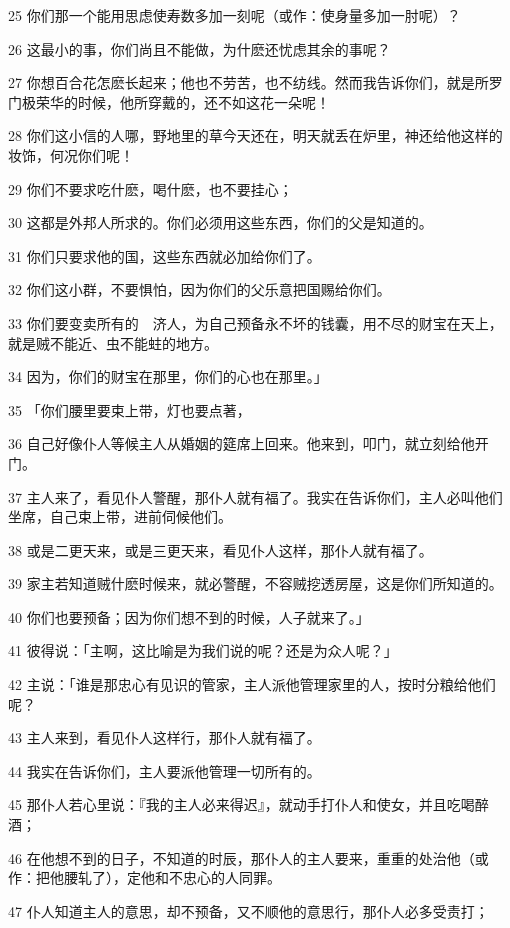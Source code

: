 \par 25 你们那一个能用思虑使寿数多加一刻呢（或作：使身量多加一肘呢）？
\par 26 这最小的事，你们尚且不能做，为什麽还忧虑其余的事呢？
\par 27 你想百合花怎麽长起来；他也不劳苦，也不纺线。然而我告诉你们，就是所罗门极荣华的时候，他所穿戴的，还不如这花一朵呢！
\par 28 你们这小信的人哪，野地里的草今天还在，明天就丢在炉里，神还给他这样的妆饰，何况你们呢！
\par 29 你们不要求吃什麽，喝什麽，也不要挂心；
\par 30 这都是外邦人所求的。你们必须用这些东西，你们的父是知道的。
\par 31 你们只要求他的国，这些东西就必加给你们了。
\par 32 你们这小群，不要惧怕，因为你们的父乐意把国赐给你们。
\par 33 你们要变卖所有的　济人，为自己预备永不坏的钱囊，用不尽的财宝在天上，就是贼不能近、虫不能蛀的地方。
\par 34 因为，你们的财宝在那里，你们的心也在那里。」
\par 35 「你们腰里要束上带，灯也要点著，
\par 36 自己好像仆人等候主人从婚姻的筵席上回来。他来到，叩门，就立刻给他开门。
\par 37 主人来了，看见仆人警醒，那仆人就有福了。我实在告诉你们，主人必叫他们坐席，自己束上带，进前伺候他们。
\par 38 或是二更天来，或是三更天来，看见仆人这样，那仆人就有福了。
\par 39 家主若知道贼什麽时候来，就必警醒，不容贼挖透房屋，这是你们所知道的。
\par 40 你们也要预备；因为你们想不到的时候，人子就来了。」
\par 41 彼得说：「主啊，这比喻是为我们说的呢？还是为众人呢？」
\par 42 主说：「谁是那忠心有见识的管家，主人派他管理家里的人，按时分粮给他们呢？
\par 43 主人来到，看见仆人这样行，那仆人就有福了。
\par 44 我实在告诉你们，主人要派他管理一切所有的。
\par 45 那仆人若心里说：『我的主人必来得迟』，就动手打仆人和使女，并且吃喝醉酒；
\par 46 在他想不到的日子，不知道的时辰，那仆人的主人要来，重重的处治他（或作：把他腰轧了），定他和不忠心的人同罪。
\par 47 仆人知道主人的意思，却不预备，又不顺他的意思行，那仆人必多受责打；
